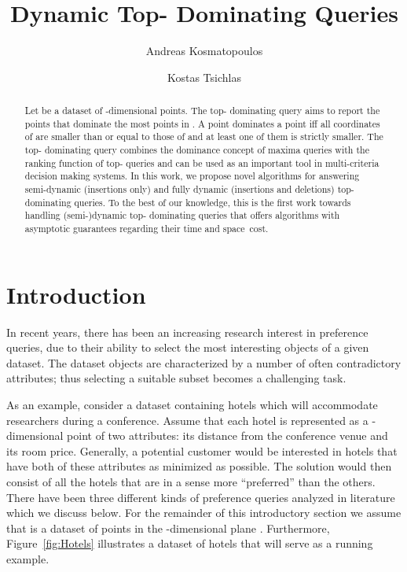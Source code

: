 \documentclass{llncs}
\begin{document}
\mainmatter              
\title{Dynamic Top- Dominating Queries}
  \author{Andreas Kosmatopoulos \and Kostas Tsichlas}
 

\maketitle              
\begin{abstract}
Let  be a dataset of  -dimensional points. The top- dominating query aims to report the  points that dominate the most points in . A point  dominates a point  iff all coordinates of  are smaller than or equal to those of  and at least one of them is strictly smaller. The top- dominating query combines the dominance concept of maxima queries with the ranking function of top- queries and can be used as an important tool in multi-criteria decision making systems. In this work, we propose novel algorithms for answering semi-dynamic (insertions only) and fully dynamic (insertions and deletions) top- dominating queries. To the best of our knowledge, this is the first work towards handling (semi-)dynamic top- dominating queries that offers algorithms with asymptotic guarantees regarding their time and space~cost.
\end{abstract}

\section{Introduction} \label{section:Introduction}
In recent years, there has been an increasing research interest in preference queries, due to their ability to select the most interesting objects of a given dataset. The dataset objects are characterized by a number of often contradictory attributes; thus selecting a suitable subset becomes a challenging task.

As an example, consider a dataset containing hotels which will accommodate researchers during a conference. Assume that each hotel is represented as a -dimensional point of two attributes: its distance from the conference venue and its room price. Generally, a potential customer would be interested in hotels that have both of these attributes as minimized as possible. The solution would then consist of all the hotels that are in a sense more ``preferred'' than the others. There have been three different kinds of preference queries analyzed in literature which we discuss below. For the remainder of this introductory section we assume that  is a dataset of points in the -dimensional plane . Furthermore, Figure~\ref{fig:Hotels} illustrates a dataset of hotels that will serve as a running example.
\end{document}
